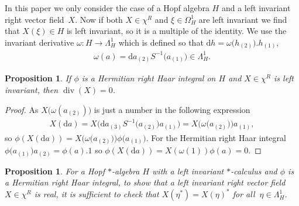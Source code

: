 \documentclass[10pt,a4paper]{amsart}
\numberwithin{equation}{section}
\newtheorem{Proposition}[Theorem]{Proposition}
 { \theoremstyle{definition}
\newtheorem{Definition}[Theorem]{Definition}
\newtheorem{Note}[Theorem]{Note}
\newtheorem{Example}[Theorem]{Example}
\newtheorem{Remark}[Theorem]{Remark} }
\newcommand{\extd}{\mathrm{d}}
\newcommand{\<}{\langle}
\renewcommand{\>}{\rangle}
\begin{document}
In this paper we only consider the case of a Hopf algebra $ H $ and a left invariant right vector field~$ X $. Now if both $ X \in \chi^{R} $ and $ \xi \in \Omega_{H}^{1} $ are left invariant we find that $ X(\xi) \in H$ is left invariant, so it is a multiple of the identity. We use the invariant derivative $ \omega \colon H\rightarrow \Lambda_{H}^{1} $ which is defined so that $ \extd h=\omega \big(h_{(2)}\big). h_{(1)} $,
\begin{gather}\label{e58}
	\omega (a)=\extd a_{(2)} S^{-1}\big(a_{(1)}\big) \in \Lambda_{H}^{1}.
\end{gather}
\begin{Proposition}\label{prop2}
	If $ \phi $ is a Hermitian right Haar integral on $ H $ and $ X \in \chi^{R} $ is left invariant, then $ \operatorname{div} (X) =0 $.
\end{Proposition}
\begin{proof}
	As $ X \big( \omega (a_{(2)}) \big) $ is just a number in the following expression
	\begin{gather*}
	X(\extd a) =X\big( \extd a_{(3)} S^{-1} \big(a_{(2)}\big) a_{(1)} \big)= X \big( \omega \big(a_{(2)}\big) \big) a_{(1)},
	\end{gather*}
	so $ \phi (	X(\extd a))	=X \big( \omega \big(a_{(2)}\big) \big) \phi \big(a_{(1)} \big) $. For the Hermitian right Haar integral $ \phi \big(a_{(1)}\big) a_{(2)}=\phi (a).1 $
	so $ 	\phi (	X(\extd a))	= X( \omega( 1 ) )\phi (a)=0$.
\end{proof}
\begin{Proposition}\label{P3}
	For a Hopf $ * $-algebra $ H $ with a left invariant $ * $-calculus and $ \phi $ is a Hermitian right Haar integral, to show that a left invariant right vector field $ X \in\chi^{R} $ is real, it is sufficient to check that $ X(\eta^{*})= X(\eta)^{*} $ for all $\ \eta \in \Lambda_{H}^{1} $.
\end{Proposition}
\end{document}
